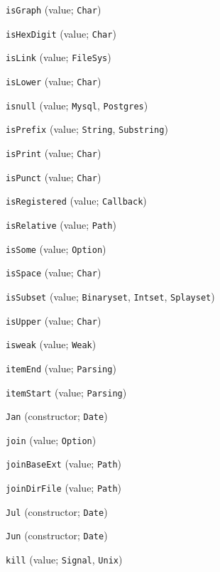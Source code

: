 \begin{description}
\item[] \verb"isGraph" (value; \verb"Char")
\item[] \verb"isHexDigit" (value; \verb"Char")
\item[] \verb"isLink" (value; \verb"FileSys")
\item[] \verb"isLower" (value; \verb"Char")
\item[] \verb"isnull" (value; \verb"Mysql", \verb"Postgres")
\item[] \verb"isPrefix" (value; \verb"String", \verb"Substring")
\item[] \verb"isPrint" (value; \verb"Char")
\item[] \verb"isPunct" (value; \verb"Char")
\item[] \verb"isRegistered" (value; \verb"Callback")
\item[] \verb"isRelative" (value; \verb"Path")
\item[] \verb"isSome" (value; \verb"Option")
\item[] \verb"isSpace" (value; \verb"Char")
\item[] \verb"isSubset" (value; \verb"Binaryset", \verb"Intset", \verb"Splayset")
\item[] \verb"isUpper" (value; \verb"Char")
\item[] \verb"isweak" (value; \verb"Weak")
\item[] \verb"itemEnd" (value; \verb"Parsing")
\item[] \verb"itemStart" (value; \verb"Parsing")
\\[2ex]

\item[] \verb"Jan" (constructor; \verb"Date")
\item[] \verb"join" (value; \verb"Option")
\item[] \verb"joinBaseExt" (value; \verb"Path")
\item[] \verb"joinDirFile" (value; \verb"Path")
\item[] \verb"Jul" (constructor; \verb"Date")
\item[] \verb"Jun" (constructor; \verb"Date")
\\[2ex]

\item[] \verb"kill" (value; \verb"Signal", \verb"Unix")
\\[2ex]


\end{description}
